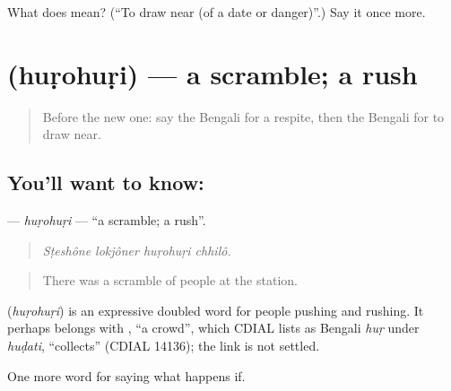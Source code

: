\begin{tcolorbox}[breakable,colback=teal!4,colframe=teal!35!black,title={Before you move on}]
What does   mean? (\textquotedblleft{}To draw near (of a date or danger)\textquotedblright{}.) Say it once more.
\end{tcolorbox}
\section[\texorpdfstring{\bn{হুড়োহুড়ি} (huṛohuṛi)}{হুড়োহুড়ি (huṛohuṛi)}]{ (huṛohuṛi) — a scramble; a rush}

\label{lesson:BN-C544-hurohuri}



\begin{quote}
Before the new one: say the Bengali for a respite, then the Bengali for to draw near.
\end{quote}

\subsection*{You'll want to know: }
\textbf{} — \emph{huṛohuṛi} — \textquotedblleft{}a scramble; a rush\textquotedblright{}.

\begin{quote}
   
\end{quote}

\begin{quote}
\emph{Sṭeshône lokjôner huṛohuṛi chhilô.}
\end{quote}

\begin{quote}
There was a scramble of people at the station.
\end{quote}

\begin{cousinweb}
\textbf{} (\emph{huṛohuṛi}) is an expressive doubled word for people pushing and rushing. It perhaps belongs with , \textquotedblleft{}a crowd\textquotedblright{}, which CDIAL lists as Bengali \emph{huṛ} under \emph{huḍati}, \textquotedblleft{}collects\textquotedblright{} (CDIAL 14136); the link is not settled.
\end{cousinweb}

\begin{grammarlens}[title={What you've built}]
One more word for saying what happens if.
\end{grammarlens}

